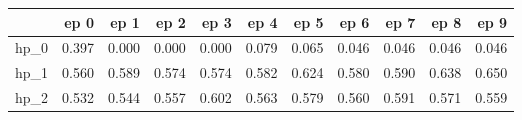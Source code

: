 \begin{tabular}{lrrrrrrrrrr}
\toprule
{} &   ep 0 &   ep 1 &   ep 2 &   ep 3 &   ep 4 &   ep 5 &   ep 6 &   ep 7 &   ep 8 &   ep 9 \\
\midrule
hp\_0 &  0.397 &  0.000 &  0.000 &  0.000 &  0.079 &  0.065 &  0.046 &  0.046 &  0.046 &  0.046 \\
hp\_1 &  0.560 &  0.589 &  0.574 &  0.574 &  0.582 &  0.624 &  0.580 &  0.590 &  0.638 &  0.650 \\
hp\_2 &  0.532 &  0.544 &  0.557 &  0.602 &  0.563 &  0.579 &  0.560 &  0.591 &  0.571 &  0.559 \\
\bottomrule
\end{tabular}
